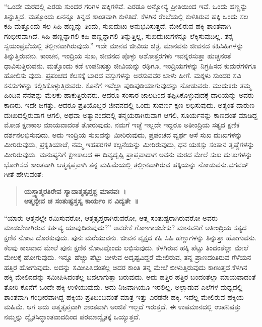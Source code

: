 \vskip 4pt

“ಒಂದೇ ಮರದಲ್ಲಿ ಎರಡು ಸುಂದರ ಗರಿಗಳ ಹಕ್ಕಿಗಳಿವೆ. ಎರಡೂ ಅನ್ಯೋನ್ಯ ಪ್ರೀತಿಯಿಂದ ಇವೆ. ಒಂದು ಹಣ್ಣನ್ನು ತಿನ್ನುತ್ತಿದೆ. ಮತ್ತೊಂದು ಏನನ್ನೂ ತಿನ್ನದೆ ಶಾಂತವಾಗಿ ಕುಳಿತಿದೆ. ಕೆಳಗಿನ ರೆಂಬೆಯಲ್ಲಿ ಕುಳಿತಿರುವ ಹಕ್ಕಿ ಒಂದು ಸಲ ಕಹಿ ಮತ್ತೊಂದು ಸಲ ಸಿಹಿ ಹಣ್ಣನ್ನು ತಿಂದು, ಸುಖದುಃಖ ಅನುಭವಿಸುತ್ತದೆ. ಮೇಲಿರುವ ಹಕ್ಕಿ ಶಾಂತವಾಗಿ ಗಂಭೀರವಾಗಿದೆ. ಸಿಹಿ ಹಣ್ಣ\-ನ್ನಾಗಲಿ ಕಹಿ ಹಣ್ಣನ್ನಾಗಲಿ ತಿನ್ನುತ್ತಿಲ್ಲ, ಸುಖದುಃಖಗಳನ್ನೂ ಲೆಕ್ಕಿಸುವುದಿಲ್ಲ. ತನ್ನ ಸ್ವಯಂಪ್ರಭೆಯಲ್ಲಿ ತಲ್ಲೀನವಾಗಿರುವುದು.” ಇದೇ ಮಾನವ ಜೀವಿಯ ಚಿತ್ರ. ಮಾನವನು ಜೀವನದ ಕಹಿಸಿಹಿಗಳನ್ನು ತಿನ್ನುತ್ತಿರುವನು. ಕಾಂಚನ, ಇಂದ್ರಿಯ ಸುಖ, ಜೀವನದ ಪೊಳ್ಳು ಆಶೋತ್ತರಗಳು ಇವನ್ನರಸುತ್ತಾ ಹುಚ್ಚನಂತೆ ಧಾವಿಸು\-ತ್ತಿರುವನು. ಮತ್ತೊಂದು ಕಡೆ ಉಪನಿಷತ್ತು ಜೀವಿಯನ್ನು ರಥಿಗೂ, ಇಂದ್ರಿಯಗಳನ್ನು ನಿಗ್ರಹಿಸದ ಕುದುರೆಗಳಿಗೂ ಹೋಲಿಸು ವುದು. ಪ್ರಪಂಚದ ಕೆಲಸಕ್ಕೆ ಬಾರದ ವಸ್ತುಗಳನ್ನು ಅರಸುವವರ ಬಾಳು ಹೀಗೆ. ಮಕ್ಕಳು ಸುಂದರ ಸವಿ ಕನಸುಗಳನ್ನು ಕಲ್ಪಿಸಿಕೊಳ್ಳುತ್ತಿರುವರು. ಕೊನೆಗೆ ಇವೆಲ್ಲಾ ಪುಡಿಪುಡಿಯಾಗುವುದನ್ನು ನೋಡುವರು. ಮುದುಕರು ತಮ್ಮ ಹಿಂದಿನ ನೆನಪನ್ನು ಮೆಲಕು ಹಾಕುತ್ತಿರುವರು. ಆದರೂ ಸಂಸಾರ ಜಾಲದಿಂದ ತಪ್ಪಿಸಿಕೊಳ್ಳುವುದಕ್ಕೆ ದಾರಿಯನ್ನು ಅವರು ಕಾಣರು. ಇದೇ ಜಗತ್ತು. ಆದರೂ ಪ್ರತಿಯೊಬ್ಬರ ಜೀವನದಲ್ಲಿ ಒಂದು ಸುವರ್ಣ ಕ್ಷಣ ಲಭಿಸುವುದು. ಅತ್ಯಂತ ದಾರುಣ ದುಃಖದಲ್ಲಿರುವಾಗ ಆಗಲಿ, ಅಥವಾ ಅತ್ಯಾನಂದದಲ್ಲಿ ತನ್ಮಯರಾಗಿರುವಾಗ ಆಗಲಿ, ಸೂರ್ಯನನ್ನು ಕಾಣದಂತೆ ಮಾಡಿದ್ದ ಮೋಡ ಕ್ಷಣಕಾಲ ಮಾಯವಾದಂತೆ ತೋರುವುದು. ನಮಗೆ ಇಚ್ಛೆ ಇಲ್ಲದೇ ಇದ್ದರೂ ಅತೀಂದ್ರಿಯ ಸತ್ಯದ ಕ್ಷಣಿಕ ದರ್ಶನ\break ಲಭಿಸುವುದು. ಅದು ಇಂದ್ರಿಯ ಸುಖವನ್ನು ಮೀರಿರುವುದು, ಪ್ರಪಂಚದ ವ್ಯರ್ಥ ಆಸೆ ಸುಖ ದುಃಖಗಳನ್ನು ಮೀರಿರುವುದು, ಪ್ರಕೃತಿಯಾಚೆ, ನಮ್ಮ ಇಹಪರಗಳ ಕಲ್ಪನೆಯನ್ನು ಮೀರಿರುವುದು, ಧನ ಯಶಸ್ಸು ಸಂತಾನ ತೃಷ್ಣೆಗಳನ್ನು ಮೀರಿರುವುದು. ಮನುಷ್ಯನಿಗೆ ಕ್ಷಣಕಾಲದ ಈ ದಿವ್ಯದೃಷ್ಟಿ ಪ್ರಾಪ್ತವಾದಾಗ ಅವನು ಮರದ ಮೇಲೆ ಸುಖ ದುಃಖಗಳನ್ನು ಭೋಗಿಸದೆ ಶಾಂತವಾಗಿ ಆತ್ಮತೃಪ್ತವಾಗಿ ತನ್ನ ಮಹಿಮೆಯಲ್ಲಿ ತಲ್ಲೀನವಾಗಿರುವ ಹಕ್ಕಿಯನ್ನು ನೋಡುವನು.\break ಭಗವದ್​ಗೀತೆ ಹೇಳುವಂತೆ:

\begin{verse}
\textbf{ಯಸ್ತ್ವಾತ್ಮರತಿರೇವ ಸ್ಯಾದಾತ್ಮತೃಪ್ತಶ್ಚ ಮಾನವಃ~।}\\\textbf{ಆತ್ಮನ್ಯೇವ ಚ ಸಂತುಷ್ಟಸ್ತಸ್ಯ ಕಾರ್ಯಂ ನ ವಿದ್ಯತೇ~॥}
\end{verse}

“ಯಾರು ಆತ್ಮನಲ್ಲೇ ರಮಿಸುವರೋ, ಆತ್ಮತೃಪ್ತರಾಗಿರುವರೋ, ಆತ್ಮ ಸಂತುಷ್ಟರಾಗಿರುವರೋ ಅವರು ಮಾಡಬೇಕಾಗಿರುವ ಕರ್ತವ್ಯ ಯಾವುದಿರುವುದು?” ಅವರೇಕೆ ಗೊಣಗಾಡಬೇಕು? ಮಾನವನಿಗೆ ಅತೀಂದ್ರಿಯ ಸತ್ಯದ ಕ್ಷಣಿಕ ನೋಟ ದೊರಕುವುದು. ಪುನಃ ಮರೆಯುವನು. ಜೀವನ ವೃಕ್ಷದ ಕಹಿ ಸಿಹಿ ಹಣ್ಣುಗಳನ್ನು ತಿನ್ನುತ್ತಾ ಹೋಗುವನು. ಕೆಲವು ಕಾಲವಾದ ಮೇಲೆ ಪುನಃ ಕ್ಷಣಿಕ ನೋಟವೊಂದು ಲಭಿಸುವುದು. ಕೆಳಗಿರುವ ಹಕ್ಕಿ ಪೆಟ್ಟು ತಿಂದಂತೆಲ್ಲಾ ಮೇಲೆ ಮೇಲಕ್ಕೆ ಹೋಗುವುದು. ಇನ್ನೂ ಹೆಚ್ಚು ಪೆಟ್ಟು ಬೀಳುವ ಅದೃಷ್ಟವಿದ್ದರೆ ಮೇಲಿರುವ, ತನ್ನ ಪ್ರಾಣದಂತಿರುವ ಗೆಳೆಯನ ಹತ್ತಿರ ಹೋಗುವುದು. ಅದನ್ನು ಸಮೀಪಿಸಿದಂತೆಲ್ಲ ಅದರ ಕಾಂತಿ ತನ್ನ ಮೇಲೆ ಬೀಳುತ್ತಿರುವುದು ಕಾಣುತ್ತದೆ.\break ಕೆಳಗಿನ ಹಕ್ಕಿ ಮೇಲಿನದನ್ನು ಸಮೀಪಿಸಿದಂತೆಲ್ಲ ಬದಲಾಗುತ್ತಾ ಬರುವುದು. ಅದು ಹತ್ತಿರ ಹತ್ತಿರ ಬಂದಂತೆಲ್ಲಾ ಮಾಯವಾದಂತೆ ತೋರಿ ಕೊನೆಗೆ ಒಂದೇ ಹಕ್ಕಿ ಉಳಿಯುವುದು. ಅದು ನಿಜವಾಗಿಯೂ ಇರಲಿಲ್ಲ. ಅಲ್ಲಾಡುವ ಎಲೆಗಳ ಮಧ್ಯದಲ್ಲಿ ಶಾಂತವಾಗಿ ಗಂಭೀರವಾಗಿದ್ದ ಹಕ್ಕಿಯ ಪ್ರತಿಬಿಂಬದಂತೆ ಮಾತ್ರ ಇತ್ತು ಎರಡನೇ ಹಕ್ಕಿ. ಇದೆಲ್ಲ ಮೇಲಿರುವ ಹಕ್ಕಿಯ ಮಹಿಮೆ. ಆಗ ಅದು ಆತ್ಮತೃಪ್ತವಾಗಿ ಶಾಂತವಾಗಿ ಅಂಜಿಕೆ ಇಲ್ಲದೆ ಇರುತ್ತದೆ. ಈ ಉಪಮಾನದಲ್ಲಿ ಉಪನಿಷತ್ತು ನಮ್ಮನ್ನು ದ್ವೈತಸಿದ್ಧಾಂತವಾದದಿಂದ ಪರಮಾದ್ವೈತಕ್ಕೆ ಒಯ್ಯುತ್ತದೆ.

